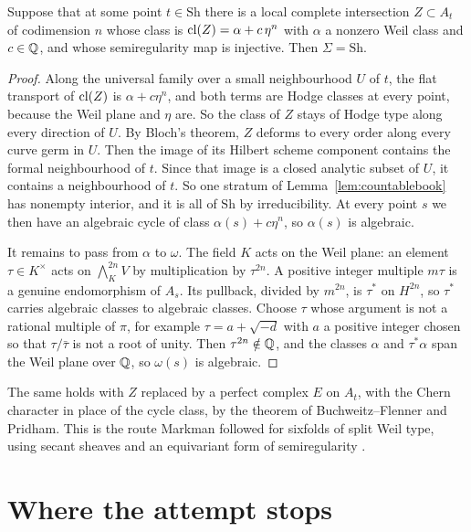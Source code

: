 \begin{theorem}\label{thm:semiregbook}
Suppose that at some point $t\in\mathrm{Sh}$ there is a local complete intersection
$Z\subset A_{t}$ of codimension $n$ whose class is
$\operatorname{cl}(Z)=\alpha+c\,\eta^{n}$ with $\alpha$ a nonzero Weil class and
$c\in\mathbb{Q}$, and whose semiregularity map is injective. Then $\Sigma=\mathrm{Sh}$.
\end{theorem}

\begin{proof}
Along the universal family over a small neighbourhood $U$ of $t$, the flat
transport of $\operatorname{cl}(Z)$ is $\alpha+c\eta^{n}$, and both terms are Hodge
classes at every point, because the Weil plane and $\eta$ are. So the class
of $Z$ stays of Hodge type along every direction of $U$. By Bloch's theorem,
$Z$ deforms to every order along every curve germ in $U$. Then the image of
its Hilbert scheme component contains the formal neighbourhood of $t$. Since
that image is a closed analytic subset of $U$, it contains a neighbourhood
of $t$. So one stratum of Lemma~\ref{lem:countablebook} has nonempty interior,
and it is all of $\mathrm{Sh}$ by irreducibility. At every point $s$ we then have an
algebraic cycle of class $\alpha(s)+c\eta^{n}$, so $\alpha(s)$ is
algebraic.

It remains to pass from $\alpha$ to $\omega$. The field $K$ acts on the
Weil plane: an element $\tau\in K^{\times}$ acts on $\bigwedge^{2n}_{K}V$ by
multiplication by $\tau^{2n}$. A positive integer multiple $m\tau$ is a
genuine endomorphism of $A_{s}$. Its pullback, divided by $m^{2n}$, is
$\tau^{*}$ on $H^{2n}$, so $\tau^{*}$ carries algebraic classes to
algebraic classes. Choose $\tau$ whose argument is not a rational multiple of $\pi$, for
example $\tau=a+\sqrt{-d}$ with $a$ a positive integer chosen so that
$\tau/\bar\tau$ is not a root of unity. Then $\tau^{2n}\notin\mathbb{Q}$, and the classes
$\alpha$ and $\tau^{*}\alpha$ span the Weil plane over $\mathbb{Q}$, so $\omega(s)$
is algebraic.
\end{proof}

The same holds with $Z$ replaced by a perfect complex $E$ on $A_{t}$, with
the Chern character in place of the cycle class, by the theorem of
Buchweitz--Flenner and Pridham. This is the route Markman followed for
sixfolds of split Weil type, using secant sheaves and an equivariant form
of semiregularity \cite{Mar25b}.

\section{Where the attempt stops}\label{sec:stopsbook}

